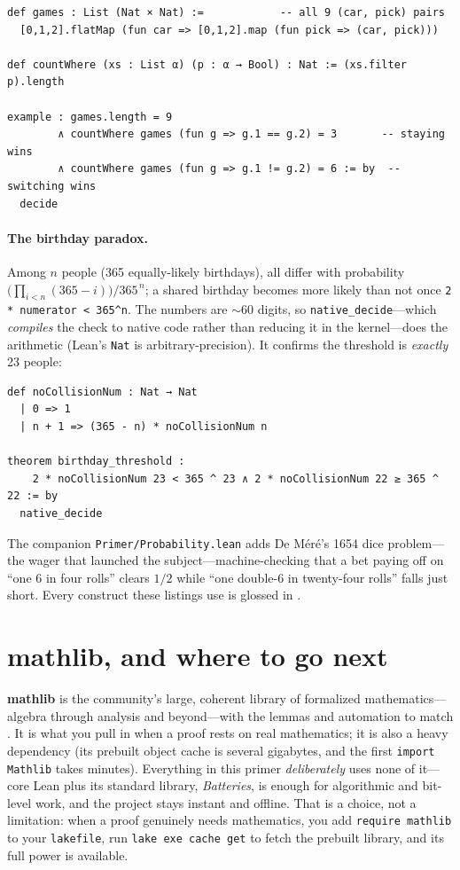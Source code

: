 \documentclass[11pt]{article}
\newcommand{\code}[1]{\lstinline[basicstyle=\ttfamily]|#1|}
\begin{document}
\begin{lstlisting}
def games : List (Nat × Nat) :=            -- all 9 (car, pick) pairs
  [0,1,2].flatMap (fun car => [0,1,2].map (fun pick => (car, pick)))

def countWhere (xs : List α) (p : α → Bool) : Nat := (xs.filter p).length

example : games.length = 9
        ∧ countWhere games (fun g => g.1 == g.2) = 3       -- staying wins
        ∧ countWhere games (fun g => g.1 != g.2) = 6 := by  -- switching wins
  decide
\end{lstlisting}

\paragraph{The birthday paradox.} Among $n$ people (365 equally-likely
birthdays), all differ with probability $\bigl(\prod_{i<n}(365-i)\bigr)/365^{\,n}$;
a shared birthday becomes more likely than not once \code{2 * numerator < 365^n}.
The numbers are $\sim$60 digits, so \code{native_decide}---which \emph{compiles}
the check to native code rather than reducing it in the kernel---does the
arithmetic (Lean's \code{Nat} is arbitrary-precision). It confirms the threshold
is \emph{exactly} 23 people:

\begin{lstlisting}
def noCollisionNum : Nat → Nat
  | 0 => 1
  | n + 1 => (365 - n) * noCollisionNum n

theorem birthday_threshold :
    2 * noCollisionNum 23 < 365 ^ 23 ∧ 2 * noCollisionNum 22 ≥ 365 ^ 22 := by
  native_decide
\end{lstlisting}

\noindent The companion \code{Primer/Probability.lean} adds De M\'er\'e's 1654
dice problem---the wager that launched the subject---machine-checking that a bet
paying off on ``one 6 in four rolls'' clears $1/2$ while ``one double-6 in
twenty-four rolls'' falls just short. Every construct these listings use is
glossed in .

\section{mathlib, and where to go next}\label{sec:next}
\textbf{mathlib} is the community's large, coherent library of formalized
mathematics---algebra through analysis and beyond---with the lemmas and
automation to match \cite{avigad-mil}. It is what you pull in when a proof rests
on real mathematics; it is also a heavy dependency (its prebuilt object cache is
several gigabytes, and the first \code{import Mathlib} takes minutes). Everything
in this primer \emph{deliberately} uses none of it---core Lean plus its standard
library, \emph{Batteries}, is enough for algorithmic and bit-level work, and the
project stays instant and offline. That is a choice, not a limitation: when a
proof genuinely needs mathematics, you add \verb|require mathlib| to your
\texttt{lakefile}, run \verb|lake exe cache get| to fetch the prebuilt library,
and its full power is available.
\end{document}
